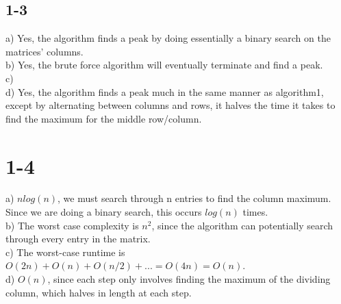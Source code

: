 \documentclass[10pt,a4paper]{article}
\begin{document}
\subsection*{1-3}
a) Yes, the algorithm finds a peak by doing essentially a binary search on the matrices' columns.\\
b) Yes, the brute force algorithm will eventually terminate and find a peak.\\
c)\\
d) Yes, the algorithm finds a peak much in the same manner as algorithm1, except by alternating between columns and rows, it halves the time it takes to find the maximum  for the middle row/column.
\section{1-4}
a) $nlog(n)$, we must search through n entries to find the column maximum. Since we are doing a binary search, this occurs $log(n)$ times.\\
b) The worst case complexity is $n^2$, since the algorithm can potentially search through every entry in the matrix.\\
c) The worst-case runtime is $O(2n)+O(n)+O(n/2)+...= O(4n)= O(n)$. \\
d) $O(n)$, since each step only involves finding the maximum of the dividing column, which halves in length at each step.
\end{document}
